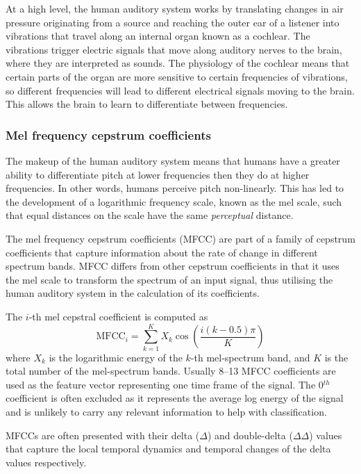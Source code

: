 At a high level, the human auditory system works by translating changes in air
pressure originating from a source and reaching the outer ear of a listener
into vibrations that travel along an internal organ known as a cochlear. The
vibrations trigger electric signals that move along auditory nerves to the
brain, where they are interpreted as sounds. The physiology of the cochlear
means that certain parts of the organ are more sensitive to certain frequencies
of vibrations, so different frequencies will lead to different electrical
signals moving to the brain. This allows the brain to learn to differentiate
between frequencies.

\subsubsection{Mel frequency cepstrum coefficients}

The makeup of the human auditory system means that humans have a greater ability
to differentiate pitch at lower frequencies then they do at higher frequencies.
In other words, humans perceive pitch non-linearly. This has led to the
development of a logarithmic frequency scale, known as the mel scale, such that
equal distances on the scale have the same \textit{perceptual} distance.

The mel frequency cepstrum coefficients (MFCC) are part of a family of cepstrum
coefficients that capture information about the rate of change in different
spectrum bands. MFCC differs from other cepstrum coefficients in that it uses the
mel scale to transform the spectrum of an input signal, thus utilising the human
auditory system in the calculation of its coefficients.

The $i$-th mel cepstral coefficient is computed as~\cite{davis1980comparison}
\begin{equation}
\text{MFCC}_i = \sum_{k=1}^{K} X_k \cos \left(
  \frac{i(k-0.5)\pi}{K}
\right)
\end{equation}
where $X_k$ is the logarithmic energy of the $k$-th mel-spectrum band, and $K$
is the total number of the mel-spectrum bands. Usually 8--13 MFCC coefficients
are used as the feature vector representing one time frame of the signal. The
0$^{th}$ coefficient is often excluded as it represents the average log energy
of the signal and is unlikely to carry any relevant information to help with
classification.

MFCCs are often presented with their delta ($\Delta$) and double-delta
($\Delta\Delta$) values that capture the local temporal dynamics and temporal
changes of the delta values respectively.

